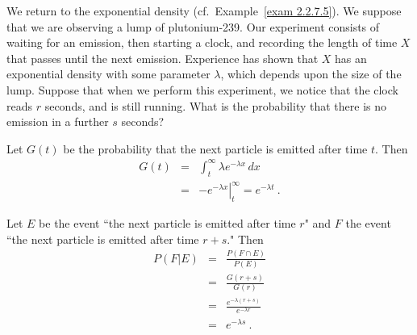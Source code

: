 \begin{example}\label{exam 4.14}
We return to the exponential density (cf.\ Example~\ref{exam 2.2.7.5}).  We suppose that we are observing a lump
of plutonium-239.  Our experiment consists of waiting for an emission, then starting a clock, and
recording the length of time $X$ that passes until the next emission.   Experience has shown that
$X$ has an exponential density with some parameter $\lambda$, which depends upon the size of the
lump.  Suppose that when we perform this experiment, we notice that the clock reads $r$ seconds,
and is still running.  What is the probability that there is no emission in a further $s$ seconds?

Let $G(t)$ be the probability that the next particle is emitted after time $t$.  Then
\begin{eqnarray*}
G(t) & = & \int_t^\infty \lambda e^{-\lambda x}\,dx \\
     & = & \left.-e^{-\lambda x}\right|_t^\infty = e^{-\lambda t}\ .
\end{eqnarray*}

Let $E$ be the event ``the next particle is emitted after time $r$" and $F$ the event ``the
next particle is emitted after time $r + s$."  Then
\begin{eqnarray*}
P(F|E) & = & \frac {P(F \cap E)}{P(E)} \\
       & = & \frac {G(r + s)}{G(r)} \\
       & = & \frac {e^{-\lambda(r + s)}}{e^{-\lambda r}} \\
       & = & e^{-\lambda s}\ .
\end{eqnarray*}



\end{example}
